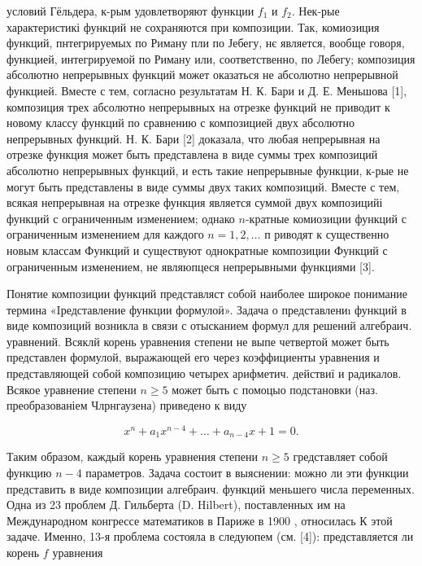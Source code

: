 \documentclass[10pt]{article}
\begin{document}
условий Гёльдера, к-рым удовлетворяют функции $f_{1}$ и $f_{2}$. Нек-рые характеристикі функций не сохраняются при композиции. Так, комиозиция функций, пнтегрируемых по Риману пли по Јебегу, нє является, вообще говоря, функцией, интегрируемой по Риману или, соответственно, по Лебегу; композиция абсолютно непрерывных функций может оказаться не абсолютно непрерывной функцией. Вместе с тем, согласно результатам Н. К. Бари и Д. Е. Меньшова [1], композиция трех абсолютно непрерывных на отрезке функций не приводит к новому классу функций по сравнению с композицией двух абсолютно непрерывных функций. Н. К. Бари [2] доказала, что любая непрерывная на отрезке функция может быть представлена в виде суммы трех композиций абсолютно непрерывных функций, и есть такие непрерывные функции, к-рые не могут быть представлены в виде суммы двух таких композиций. Вместе с тем, всякая непрерывная на отрезке функция является суммой двух композицийі функций с ограниченным изменением; однако $n$-кратные комиозиции функций с ограниченным изменением для каждого $n=1,2, \ldots$ п риводят к существенно новым классам Функций и существуют однократные композиции Функций с ограниченным изменением, не являюпцеся непрерывными функциями [3].



Понятие композиции функций представляст собой наиболее широкое понимание термина «Iредставление функции формулоӥ». Задача о представлениı функций в виде композиций возникла в связи с отысканием формул для решений алгебраич. уравнений. Всяклй корень уравнения степени не выпе четвертой может быть представлен формулой, выражающей его через коэффициенты уравнения и представляющей собой композицию четырех арифметич. действиї и радикалов. Всякое уравнение степени $n \geqslant 5$ может быть с помоцыо подстановки (наз. преобразованіем Члрнгаузена) приведено к виду



\[

x^{n}+a_{1} x^{n-4}+\ldots+a_{n-4} x+1=0 .

\]



Таким образом, каждый корень уравнения степени $n \geqslant 5$ гредставляет собой функцию $n-4$ параметров. Задача состоит в выяснении: можно ли эти функции представить в виде композиции алгебраич. функций меньшего числа переменных. Одна из 23 проблем Д. Гильберта (D. Hilbert), поставленных им на Международном конгрессе математиков в Париже в 1900 , относилась К этой задаче. Именно, 13-я проблема состояла в следуюпем (см. [4]): представляется ли корень $f$ уравнения
\end{document}
